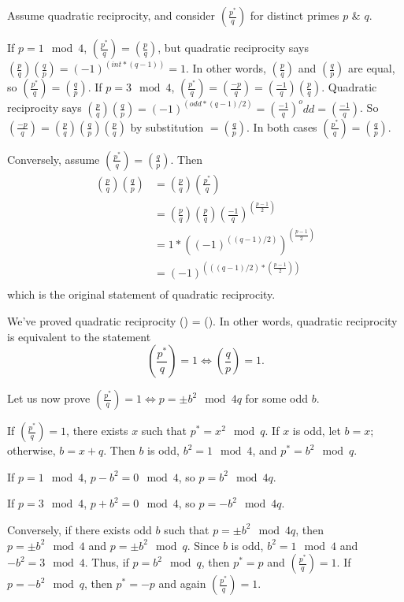 \documentclass[b5paper,12pt,oneside,openright]{memoir}
\begin{document}
Assume quadratic reciprocity, and consider $(\frac{p^*}{q})$ for distinct primes $p$ \& $q$.

If $p = 1 \mod 4$, $(\frac{p^*}{q}) = (\frac{p}{q})$, but quadratic reciprocity says $(\frac{p}{q})(\frac{q}{p}) = (-1)^(int*(q-1)) = 1$.
  In other words, $(\frac{p}{q})$ and $(\frac{q}{p})$ are equal, so $(\frac{p^*}{q}) = (\frac{q}{p})$.
If $p = 3 \mod 4$, $(\frac{p^*}{q}) = (\frac{-p}{q}) = (\frac{-1}{q})(\frac{p}{q})$. Quadratic reciprocity says
  $(\frac{p}{q})(\frac{q}{p}) = (-1)^(odd * (q-1)/2)
             = (\frac{-1}{q})^odd
             = (\frac{-1}{q})$.
  So $(\frac{-p}{q}) = (\frac{p}{q})(\frac{q}{p})(\frac{p}{q})$ by substitution
            $= (\frac{q}{p})$. In both cases $(\frac{p^*}{q}) = (\frac{q}{p})$.

Conversely, assume $(\frac{p^*}{q}) = (\frac{q}{p})$.
Then
\begin{align}
  (\frac{p}{q})(\frac{q}{p}) &= (\frac{p}{q})(\frac{p^*}{q})\\
                             &= (\frac{p}{q})(\frac{p}{q})(\frac{-1}{q})^(\frac{p-1}{2})\\
                             &= 1*((-1)^((q-1)/2))^(\frac{p-1}{2})\\
                             &= (-1)^(((q-1)/2) * (\frac{p-1}{2}))\\
\end{align}
which is the original statement of quadratic reciprocity.

We've proved quadratic reciprocity \iff () = ().
In other words, quadratic reciprocity is equivalent to the statement
\[(\frac{p^*}{q}) = 1 \iff (\frac{q}{p}) = 1.\]

Let us now prove $(\frac{p^*}{q}) = 1 \iff p = \pm b^2 \mod 4q$ for some odd $b$.

If $(\frac{p^*}{q}) = 1$, there exists $x$ such that $p^* = x^2 \mod q$. If $x$ is odd, let $b = x$; otherwise, $b = x+q$. Then $b$ is odd, $b^2 = 1 \mod 4$, and $p^* = b^2 \mod q$.

If $p = 1\mod 4$, $p - b^2 = 0 \mod 4$, so $p = b^2 \mod 4q$.

If $p = 3\mod 4$, $p + b^2 = 0 \mod 4$, so $p = -b^2 \mod 4q$.

Conversely, if there exists odd $b$ such that $p = \pm b^2 \mod 4q$, then $p = \pm b^2 \mod 4$ and $p = \pm b^2 \mod q$.
Since $b$ is odd, $b^2 = 1 \mod 4$ and $-b^2 = 3 \mod 4$.
Thus, if $p = b^2 \mod q$, then $p^* = p$ and $(\frac{p^*}{q}) = 1$.
If $p = -b^2 \mod q$, then $p^* = -p$ and again $(\frac{p^*}{q}) = 1$.
\end{document}

